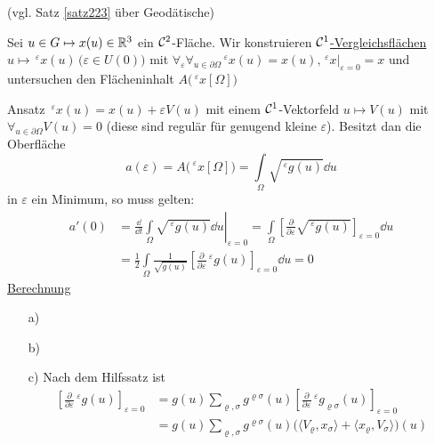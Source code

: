 \begin{beweis}
(vgl. Satz \ref{satz223} über Geodätische) \par
Sei \(u \in G \mapsto x(u) \in \mathbb{R}^3\) ein \(\mathcal{C}^2\)-Fläche. Wir konstruieren \uline{\(\mathcal{C}^1\)-Vergleichsflächen} \(u \mapsto \,^\varepsilon x(u) \, \big(\varepsilon \in U(0)\big)\) mit \(\forall_\varepsilon \forall_{u \in \partial \Omega} \,^\varepsilon x(u) = x(u), \left.\,^\varepsilon x\right|_{\varepsilon = 0} = x\) und untersuchen den Flächeninhalt \(A\big(\,^\varepsilon x[\Omega]\big)\) \par
Ansatz \uline{\(\,^\varepsilon x(u) = x(u) + \varepsilon V(u)\)} mit einem \(\mathcal{C}^1\)-Vektorfeld \(u \mapsto V(u)\) mit \uline{\(\forall_{u \in \partial \Omega} V(u) = 0\)} (diese sind regulär für genugend kleine \(\varepsilon\)). Besitzt dan die Oberfläche 
\[
a(\varepsilon) = A\big(\,^\varepsilon x[\Omega]\big) = \int\limits_\Omega \sqrt{\,^\varepsilon g(u)} \dd u
\]
in \(\varepsilon\) ein Minimum, so muss gelten:
\begin{align*}
 a'(0) &= \frac{\dd}{\dd t} \left. \int\limits_\Omega \sqrt{\,^\varepsilon g(u)} \dd u \right|_{\varepsilon = 0} = \int\limits_\Omega \left[\frac{\partial}{\partial \varepsilon} \sqrt{\,^\varepsilon g(u)} \right]_{\varepsilon = 0} \dd u \\
 &= \frac12 \int\limits_\Omega \frac{1}{\sqrt{g(u)}} \left[\frac{\partial}{\partial\varepsilon} \,^\varepsilon g(u)\right]_{\varepsilon = 0} \dd u = 0
\end{align*}
\uline{Berechnung}
\begin{enumerate}
 \item[a)] 
 \item[b)] 
 \item[c)] Nach dem Hilfssatz ist
 \begin{align*}
  \left[\frac{\partial}{\partial \varepsilon} \,^\varepsilon g(u) \right]_{\varepsilon = 0} &= g(u) \sum_{\varrho, \sigma} g^{\varrho \sigma} (u) \left[ \frac{\partial}{\partial\varepsilon} \,^\varepsilon g_{\varrho \sigma}(u)\right]_{\varepsilon = 0} \\
  &= g(u) \sum_{\varrho, \sigma} g^{\varrho \sigma} (u) \big(\langle V_\varrho, x_\sigma \rangle + \langle x_\varrho, V_\sigma \rangle \big)(u)
 \end{align*}
\end{enumerate}


\end{beweis}

